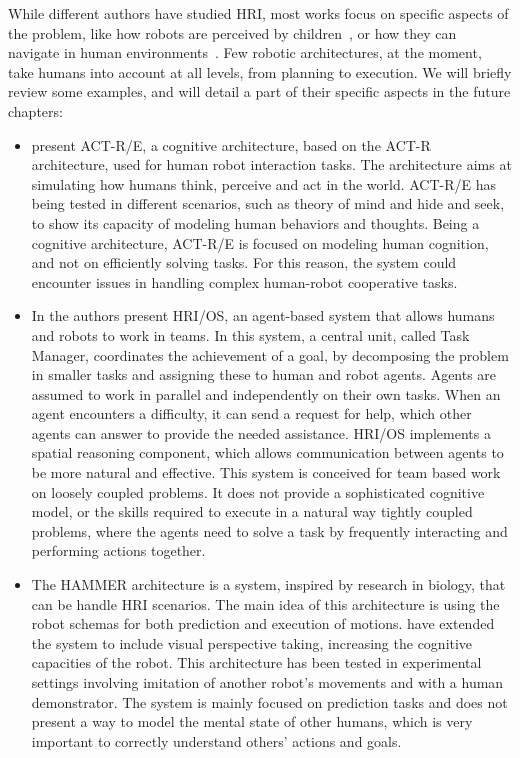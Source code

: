 While different authors have studied HRI, most works focus on specific aspects of the problem, like how robots are perceived by children~\citep{kozima2007children}, or how they can navigate in human environments~\citep{sisbot2007human}. Few robotic architectures, at the moment, take humans into account at all levels, from planning to execution. We will briefly review some examples, and will detail a part of their specific aspects in the future chapters:
\begin{itemize} 
\item \cite{trafton2013act} present ACT-R/E, a cognitive architecture, based
on the ACT-R architecture, used for human robot interaction tasks. The
architecture aims at simulating how humans think, perceive and act in
the world. ACT-R/E has being tested in different scenarios, such as
theory of mind and hide and seek, to show its capacity of modeling
human behaviors and thoughts. Being a cognitive architecture, ACT-R/E is focused on modeling human 
cognition, and not on efficiently solving tasks. For this reason, the system could encounter issues in handling complex human-robot cooperative tasks. 

\item In \cite{Fong_2006} the authors present  HRI/OS, an agent-based system
that allows humans and robots to work in teams. In this system, a central unit, called Task Manager, coordinates the achievement of a goal, by decomposing the problem in smaller tasks and assigning these to human and robot agents. Agents are assumed to work in parallel and independently on their own tasks. When an agent encounters a difficulty, it can send a request for help, which other agents can answer to provide the needed assistance. HRI/OS implements a spatial reasoning component, which allows communication between agents to be more natural and effective. This system is conceived for team based work on loosely coupled problems. It does not provide a sophisticated cognitive model, or the skills required to execute in a natural way tightly coupled problems, where the agents need to solve a task by frequently interacting and performing actions together. 

\item  The HAMMER architecture \citep{demiris2003distributed} is a system, inspired by
research in biology, that can be handle HRI scenarios. The main idea of this architecture is
using the robot schemas for both prediction and execution of motions. \cite{johnson2005perceptual} have extended the system to include visual perspective taking, increasing the cognitive capacities of the robot.  This architecture has been tested in experimental settings involving imitation of another robot's movements and with a human demonstrator.  The system is mainly focused on prediction tasks and does not present a way to model the mental state of other humans, which is very important to correctly understand others' actions and goals.


\end{itemize}
